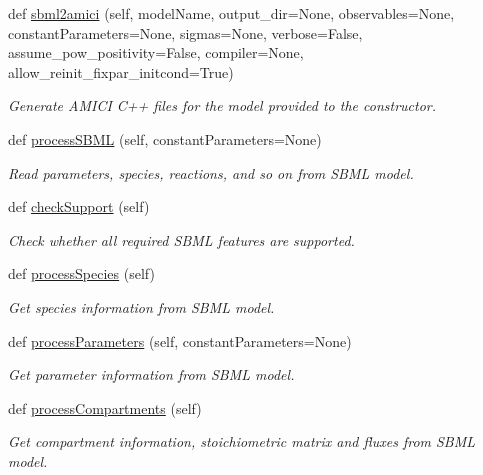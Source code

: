 \begin{DoxyCompactItemize}
def \mbox{\hyperlink{classamici_1_1sbml__import_1_1_sbml_importer_ae5cdd2444bac89e61e6f717f7736acb6}{sbml2amici}} (self, model\+Name, output\+\_\+dir=None, observables=None, constant\+Parameters=None, sigmas=None, verbose=False, assume\+\_\+pow\+\_\+positivity=False, compiler=None, allow\+\_\+reinit\+\_\+fixpar\+\_\+initcond=True)
\begin{DoxyCompactList}\small\item\em Generate A\+M\+I\+CI C++ files for the model provided to the constructor. \end{DoxyCompactList}\item 
def \mbox{\hyperlink{classamici_1_1sbml__import_1_1_sbml_importer_ac188693ab1d9fc500d55748dbde9bf89}{process\+S\+B\+ML}} (self, constant\+Parameters=None)
\begin{DoxyCompactList}\small\item\em Read parameters, species, reactions, and so on from S\+B\+ML model. \end{DoxyCompactList}\item 
def \mbox{\hyperlink{classamici_1_1sbml__import_1_1_sbml_importer_ae9585f937c02f0618abeb06dd48bcd54}{check\+Support}} (self)
\begin{DoxyCompactList}\small\item\em Check whether all required S\+B\+ML features are supported. \end{DoxyCompactList}\item 
def \mbox{\hyperlink{classamici_1_1sbml__import_1_1_sbml_importer_a4912a89bf86ec8e0c1d9758b8090e327}{process\+Species}} (self)
\begin{DoxyCompactList}\small\item\em Get species information from S\+B\+ML model. \end{DoxyCompactList}\item 
def \mbox{\hyperlink{classamici_1_1sbml__import_1_1_sbml_importer_a26d072114efe1fec695cc4030c64e1ea}{process\+Parameters}} (self, constant\+Parameters=None)
\begin{DoxyCompactList}\small\item\em Get parameter information from S\+B\+ML model. \end{DoxyCompactList}\item 
def \mbox{\hyperlink{classamici_1_1sbml__import_1_1_sbml_importer_a526afc71a857e7fdefb4754fc2f93882}{process\+Compartments}} (self)
\begin{DoxyCompactList}\small\item\em Get compartment information, stoichiometric matrix and fluxes from S\+B\+ML model. \end{DoxyCompactList}\item 

\end{DoxyCompactItemize}

